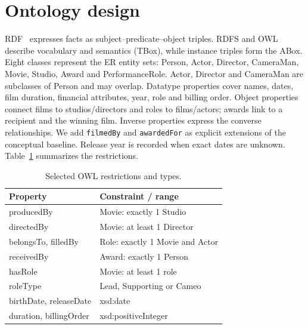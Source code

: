\documentclass[sigconf,nonacm]{acmart}
\begin{document}
\section{Ontology design}
RDF~\cite{rdf} expresses facts as subject--predicate--object triples. RDFS and OWL~\cite{owl} describe vocabulary and semantics (TBox), while instance triples form the ABox. Eight classes represent the ER entity sets: Person, Actor, Director, CameraMan, Movie, Studio, Award and PerformanceRole. Actor, Director and CameraMan are subclasses of Person and may overlap. Datatype properties cover names, dates, film duration, financial attributes, year, role and billing order. Object properties connect films to studios/directors and roles to films/actors; awards link to a recipient and the winning film. Inverse properties express the converse relationships. We add \texttt{filmedBy} and \texttt{awardedFor} as explicit extensions of the conceptual baseline. Release year is recorded when exact dates are unknown. Table~\ref{tab:rules} summarizes the restrictions.
\begin{table}[h]
\caption{Selected OWL restrictions and types.}\label{tab:rules}
\small\begin{tabular}{@{}lp{1.66in}@{}}\toprule
Property & Constraint / range\\\midrule
producedBy & Movie: exactly 1 Studio\\
directedBy & Movie: at least 1 Director\\
belongsTo, filledBy & Role: exactly 1 Movie and Actor\\
receivedBy & Award: exactly 1 Person\\
hasRole & Movie: at least 1 role\\
roleType & Lead, Supporting or Cameo\\
birthDate, releaseDate & xsd:date\\
duration, billingOrder & xsd:positiveInteger\\\bottomrule\end{tabular}
\end{table}
\clearpage
\end{document}
